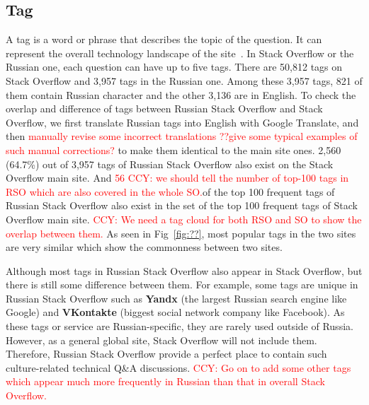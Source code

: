 \subsection{Tag}
A tag is a word or phrase that describes the topic of the question. 
It can represent the overall technology landscape of the site~\cite{???ChunyangKG}.
In Stack Overflow or the Russian one, each question can have up to five tags. 
There are 50,812 tags on Stack Overflow and 3,957 tags in the Russian one. 
Among these 3,957 tags, 821 of them contain Russian character and the other 3,136 are in English. 
To check the overlap and difference of tags between Russian Stack Overflow and Stack Overflow, we first translate Russian tags into English with Google Translate, and then \textcolor{red}{manually revise some incorrect translations ??give some typical examples of such manual corrections?} to make them identical to the main site ones.
2,560 (64.7\%) out of 3,957 tags of Russian Stack Overflow also exist on the Stack Overflow main site. 
And \textcolor{red}{56 CCY: we should tell the number of top-100 tags in RSO which are also covered in the whole SO.}of the top 100 frequent tags of Russian Stack Overflow also exist in the set of the top 100 frequent tags of Stack Overflow main site. 
\textcolor{red}{CCY: We need a tag cloud for both RSO and SO to show the overlap between them.}
As seen in Fig~\ref{fig:??}, most popular tags in the two sites are very similar which show the commonness between two sites.

Although most tags in Russian Stack Overflow also appear in Stack Overflow, but there is still some difference between them.
For example, some tags are unique in Russian Stack Overflow such as \textbf{Yandx} (the largest Russian search engine like Google) and \textbf{VKontakte} (biggest social network company like Facebook).
As these tags or service are Russian-specific, they are rarely used outside of Russia.
However, as a general global site, Stack Overflow will not include them.
Therefore, Russian Stack Overflow provide a perfect place to contain such culture-related technical Q\&A discussions.
\textcolor{red}{CCY: Go on to add some other tags which appear much more frequently in Russian than that in overall Stack Overflow.}

